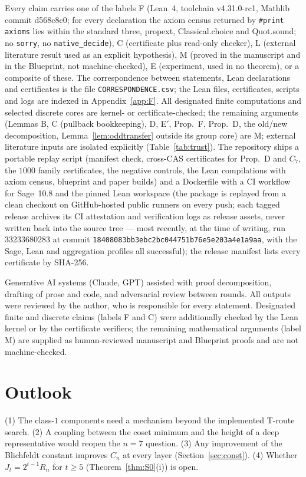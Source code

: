 \documentclass[11pt]{amsart}
\theoremstyle{remark}\newtheorem{remark}[theorem]{Remark}
\theoremstyle{definition}\newtheorem{definition}[theorem]{Definition}
\begin{document}
Every claim carries one of the labels F (Lean~4, toolchain v4.31.0-rc1, Mathlib commit d568c8c0; for every declaration the axiom census returned by \texttt{\#print axioms} lies within the standard three, propext, Classical.choice and Quot.sound; no \texttt{sorry}, no \texttt{native\_decide}), C (certificate plus read-only checker), L (external literature result used as an explicit hypothesis), M (proved in the manuscript and in the Blueprint, not machine-checked), E (experiment, used in no theorem), or a composite of these. The correspondence between statements, Lean declarations and certificates is the file \texttt{CORRESPONDENCE.csv}; the Lean files, certificates, scripts and logs are indexed in Appendix~\ref{app:F}. All designated finite computations and selected discrete cores are kernel- or certificate-checked; the remaining arguments (Lemmas B, C (pullback bookkeeping), D, E$'$, Prop.~F, Prop.~D, the old/new decomposition, Lemma~\ref{lem:oddtransfer} outside its group core) are M; external literature inputs are isolated explicitly (Table~\ref{tab:trust}). The repository ships a portable replay script (manifest check, cross-CAS certificates for Prop.~D and $C_7$, the $1000$ family certificates, the negative controls, the Lean compilations with axiom census, blueprint and paper builds) and a Dockerfile with a CI workflow for Sage~10.8 and the pinned Lean workspace (the package is replayed from a clean checkout on GitHub-hosted public runners on every push; each tagged release archives its CI attestation and verification logs as release assets, never written back into the source tree --- most recently, at the time of writing, run 33233680283 at commit \texttt{18408083bb3ebc2bc044751b76e5e203a4e1a9aa}, with the Sage, Lean and aggregation profiles all successful); the release manifest lists every certificate by SHA-256.

Generative AI systems (Claude, GPT) assisted with proof decomposition, drafting of prose and code, and adversarial review between rounds. All outputs were reviewed by the author, who is responsible for every statement. Designated finite and discrete claims (labels F and C) were additionally checked by the Lean kernel or by the certificate verifiers; the remaining mathematical arguments (label M) are supplied as human-reviewed manuscript and Blueprint proofs and are not machine-checked.

\section{Outlook}
(1) The class-$1$ components need a mechanism beyond the implemented T-route search. (2) A coupling between the coset minimum and the height of a deep representative would reopen the $n=7$ question. (3) Any improvement of the Blichfeldt constant improves $C_n$ at every layer (Section~\ref{sec:const}). (4) Whether $J_t=2^{t-1}R_n$ for $t\ge5$ (Theorem~\ref{thm:S0}(i)) is open.
\end{document}
